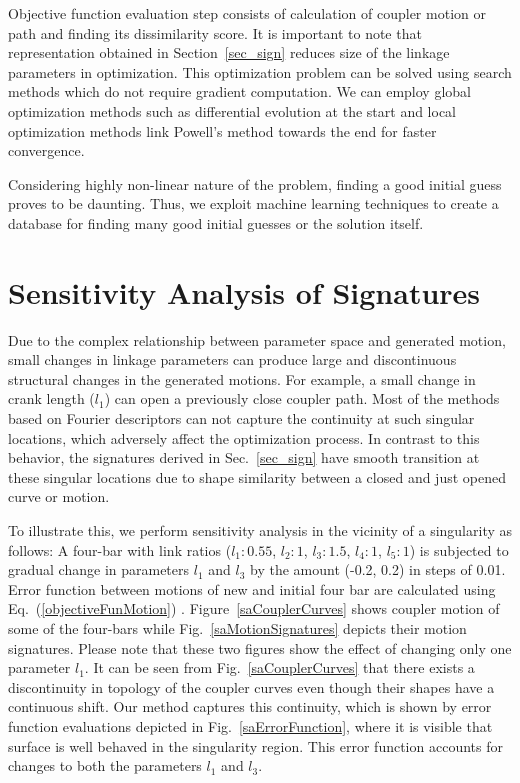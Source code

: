 \documentclass[twocolumn,10pt]{asme2ej}
\newcommand{\req}[1]{(\ref{#1})}
\begin{document}
Objective function evaluation step consists of calculation of coupler motion or path and finding its dissimilarity score.
It is important to note that representation obtained in Section~\ref{sec_sign} reduces size of the linkage parameters in optimization.
This optimization problem can be solved using search methods which do not require gradient computation.
We can employ global optimization methods such as differential evolution at the start and local optimization methods link Powell's method towards the end for faster convergence\cite{ullah1997}.

Considering highly non-linear nature of the problem, finding a good initial guess proves to be daunting. Thus, we exploit machine learning techniques to create a database for finding many good initial guesses or the solution itself.

\section{Sensitivity Analysis of Signatures}\label{sec_SA}
Due to the complex relationship between parameter space and generated motion, small changes in linkage parameters can produce large and discontinuous structural changes in the generated motions.
For example, a small change in crank length ($l_1$) can open a previously close coupler path.
Most of the methods based on Fourier descriptors can not capture the continuity at such singular locations, which adversely affect the optimization process.
In contrast to this behavior, the signatures derived in Sec.~\ref{sec_sign} have smooth transition at these singular locations due to shape similarity between a closed and just opened curve or motion.

To illustrate this, we perform sensitivity analysis in the vicinity of a singularity as follows:
A four-bar with link ratios ($l_1:0.55$, $l_2:1$, $l_3:1.5$, $l_4:1$, $l_5:1$) is subjected to gradual change in parameters $l_1$ and $l_3$ by the amount (-0.2, 0.2) in steps of 0.01.
Error function between motions of new and initial four bar are calculated using Eq.~\req{objectiveFunMotion} .
Figure~\ref{saCouplerCurves} shows coupler motion of some of the four-bars while Fig.~\ref{saMotionSignatures} depicts their motion signatures. Please note that these two figures show the effect of changing only one parameter $l_1$.
It can be seen from Fig.~\ref{saCouplerCurves} that there exists a discontinuity in topology of the coupler curves even though their shapes have a continuous shift.
Our method captures this continuity, which is shown by error function evaluations depicted in Fig.~\ref{saErrorFunction}, where it is visible that surface is well behaved in the singularity region. This error function accounts for changes to both the parameters $l_1$ and $l_3$.
\end{document}

